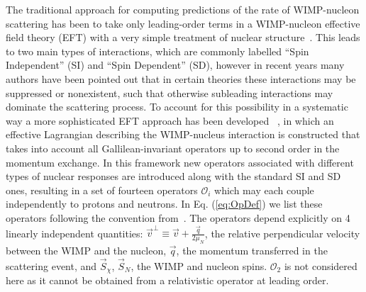 
The traditional approach for computing predictions of the rate of WIMP-nucleon scattering has been to take only leading-order terms in a WIMP-nucleon effective field theory (EFT) with a very simple treatment of nuclear structure~\cite{LEWIN}. This leads to two main types of interactions, which are commonly labelled ``Spin Independent'' (SI) and ``Spin Dependent'' (SD), however in recent years many authors have been pointed out that in certain theories these interactions may be suppressed or nonexistent, such that otherwise subleading interactions may dominate the scattering process. To account for this possibility in a systematic way a more sophisticated EFT approach has been developed ~\cite{Fitzpatrick:2012ib,Anand:MathTools,Fitzpatrick:MathTools}, in which an effective Lagrangian describing the WIMP-nucleus interaction is constructed that takes into account all Gallilean-invariant operators up to second order in the momentum exchange. In this framework new operators associated with different types of nuclear responses are introduced along with the standard SI and SD ones, resulting in a set of fourteen operators $\mathcal{O}_i$ which may each couple independently to protons and neutrons. In Eq. (\ref{eq:OpDef}) we list these operators following the convention from~\cite{Anand:MathTools}. The operators depend explicitly on 4 linearly independent quantities: $\vec{v}^{\perp} \equiv \vec{v} + \frac{\vec{q}}{2\mu_N} $, the relative perpendicular velocity between the WIMP and the nucleon, $\vec{q}$, the momentum transferred in the scattering event, and $\vec{S}_\chi$, $\vec{S}_N$, the WIMP and nucleon spins. $\mathcal{O}_2$ is not considered here as it cannot be obtained from a relativistic operator at leading order.

